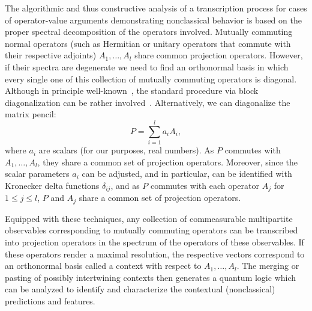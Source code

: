 \documentclass[
  twocolumn,
 showpacs,
 showkeys,
 preprintnumbers,
 amsmath,amssymb,
 aps,
 prl,
  longbibliography,
 floatfix,
 ]{revtex4-2}
\begin{document}
The  algorithmic  and thus constructive
analysis of a transcription process for cases of operator-value arguments demonstrating nonclassical behavior is based on the proper spectral decomposition of the operators involved.
Mutually commuting normal operators (such as Hermitian or unitary operators that commute with their respective adjoints)
 $A_1, \ldots, A_l$ share common projection operators.
However, if their spectra are degenerate we need to find an orthonormal basis in which every single one of this collection of mutually commuting operators is diagonal.
Although in principle well-known~\cite[Section 1.3]{Horn-Johnson-MatrixAnalysis}, the standard procedure via block diagonalization can be rather involved~\cite{Nordgren2020Jun}.
Alternatively, we can diagonalize the matrix pencil:
\begin{equation}
P = \sum_{i=1}^{l} a_i A_i,
\label{2024-convert-matrixpencil}
\end{equation}
where $a_i$ are scalars (for our purposes, real numbers).
As $P$ commutes with $A_1, \ldots, A_l$, they share a common set of projection operators.
Moreover, since the scalar parameters $a_i$ can be adjusted, and in particular, can be identified with Kronecker delta functions $\delta_{ij}$,
and as $P$ commutes with each operator $A_j$ for $1 \le j \le l$, $P$ and $A_j$ share a common set of projection operators.

Equipped with these techniques, any collection of commeasurable multipartite observables corresponding
to mutually commuting operators can be transcribed into
projection operators
in the spectrum of the operators of these observables.
If these operators render a maximal resolution, the respective vectors correspond to an orthonormal basis called a context with respect to $A_1, \ldots, A_l$.
The merging or pasting of possibly intertwining contexts then generates a quantum logic which can be
analyzed to identify and characterize the contextual (nonclassical) predictions and features.

\end{document}
